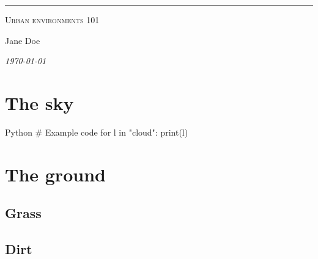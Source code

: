 \documentclass[a4paper, 10pt]{article}
\begin{document}
{\parindent0pt
{\sffamily
    {\color{cielo}{\Large ASSIGNMENT 1} 
    \rule[-.2ex]{.25ex}{1.2em}}
    {\color{lavanda}{\Large Minimal landscaping}}

    {\color{carbon}\footnotesize
        \textsc{\small Urban environments 101} \vspace{-.3em}
    
    Jane Doe \vspace{-1.4em}

    \textit{\today} \vspace{4em}}
}}


\section*{The sky}
\lipsum[4]

\begin{code}{Python}
# Example code
for l in "cloud":
    print(l)
\end{code}

\section*{The ground}
\lipsum[5][1-5]

\subsection*{Grass}
\lipsum[6]

\subsection*{Dirt}
\lipsum[8]
\end{document}
